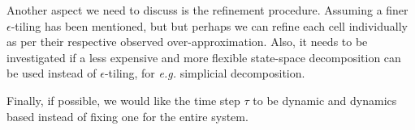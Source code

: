 Another aspect we need to discuss is the refinement procedure.
Assuming a finer $\epsilon$-tiling has been mentioned, but but perhaps
we can refine each cell individually as per their respective observed
over-approximation. Also, it needs to be investigated if a less
expensive and more flexible state-space decomposition can be used
instead of $\epsilon$-tiling, for \emph{e.g.} simplicial
decomposition.

Finally, if possible, we would like the time step $\tau$ to be dynamic
and dynamics based instead of fixing one for the entire system.



%




%

